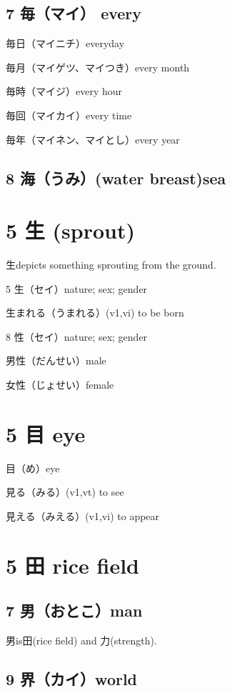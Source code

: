 \subsection{7 毎（マイ） every}

毎日（マイニチ）everyday

毎月（マイゲツ、マイつき）every month

毎時（マイジ）every hour

毎回（マイカイ）every time

毎年（マイネン、マイとし）every year

\subsection{8 海（うみ）(water breast)sea}

\section{5 生 (sprout)}

生depicts something sprouting from the ground.

5 生（セイ）nature; sex; gender

生まれる（うまれる）(v1,vi) to be born

8 性（セイ）nature; sex; gender

男性（だんせい）male

女性（じょせい）female

\section{5 目 eye}

目（め）eye

見る（みる）(v1,vt) to see

見える（みえる）(v1,vi) to appear

\section{5 田 rice field}

\subsection{7 男（おとこ）man}

男is田(rice field) and 力(strength).

\subsection{9 界（カイ）world}

